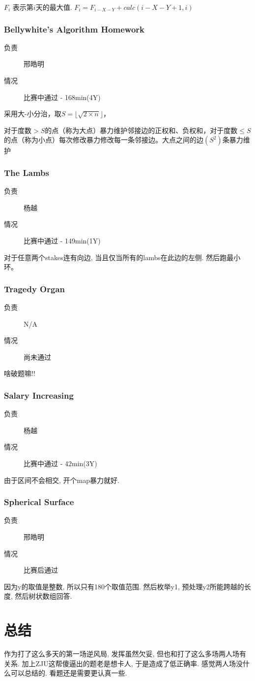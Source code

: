 \documentclass[a4paper, 11pt, nofonts, nocap, fancyhdr]{ctexart}
\newcommand{\problem}[1]{\subsubsection{#1}}
\begin{document}
$F_i$ 表示第$i$天的最大值. $F_i = F_{i-X-Y} + calc(i-X-Y+1, i)$ 

\problem{Bellywhite's Algorithm Homework}

\begin{description}
\item[负责] 邢皓明
\item[情况] 比赛中通过 - 168min(4Y)
\end{description}

采用大-小分治，取$S=\lfloor \sqrt{2\times n} \rfloor$，

对于度数$>S$的点（称为大点）暴力维护邻接边的正权和、负权和，对于度数$\leq S$的点（称为小点）每次修改暴力修改每一条邻接边。大点之间的边$(S^2)$条暴力维护

\problem{The Lambs}

\begin{description}
\item[负责] 杨越
\item[情况] 比赛中通过 - 149min(1Y)
\end{description}

对于任意两个stakes连有向边, 当且仅当所有的lambs在此边的左侧. 然后跑最小环。

\problem{Tragedy Organ}

\begin{description}
\item[负责] N/A
\item[情况] 尚未通过
\end{description}

啥破题嘛!!

\problem{Salary Increasing}

\begin{description}
\item[负责] 杨越
\item[情况] 比赛中通过 - 42min(3Y)
\end{description}

由于区间不会相交, 开个map暴力就好.

\problem{Spherical Surface}

\begin{description}
\item[负责] 邢皓明
\item[情况] 比赛后通过
\end{description}

因为y的取值是整数, 所以只有180个取值范围. 然后枚举y1, 预处理y2所能跨越的长度, 然后树状数组回答.

\section{总结}

作为打了这么多天的第一场逆风局, 发挥虽然欠妥, 但也和打了这么多场两人场有关系. 加上ZJU这帮傻逼出的题老是想卡人, 于是造成了低正确率. 感觉两人场没什么可以总结的. 看题还是需要更认真一些.
\end{document}
